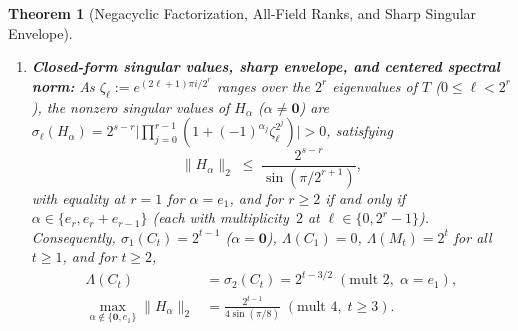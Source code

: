 \documentclass[11pt,reqno]{amsart}
\newtheorem{theorem}{Theorem}[section]
\theoremstyle{definition}
\theoremstyle{remark}
\newcommand{\zero}{\mathbf{0}}
\numberwithin{equation}{section}
\begin{document}
\begin{theorem}[Negacyclic Factorization, All-Field Ranks, and Sharp Singular Envelope]
\begin{enumerate}[leftmargin=2em,label=\textup{(\alph*)}]
    \item \textbf{Closed-form singular values, sharp envelope, and centered spectral norm:} As $\zeta_\ell := e^{(2\ell + 1)\pi i / 2^r}$ ranges over the $2^r$ eigenvalues of $T$ ($0 \le \ell < 2^r$), the nonzero singular values of $H_\alpha$ ($\alpha \neq \zero$) are $\sigma_\ell(H_\alpha) = 2^{s-r}\bigl|\prod_{j=0}^{r-1}(1 + (-1)^{\alpha_j}\zeta_\ell^{2^j})\bigr| > 0$, satisfying
    \begin{equation}
      \label{eq:spectral-env}
      \|H_\alpha\|_2 \;\le\; \frac{2^{s-r}}{\sin(\pi / 2^{r+1})},
    \end{equation}
    with equality at $r = 1$ for $\alpha = e_1$, and for $r \ge 2$ \emph{if and only if} $\alpha \in \{e_r, e_r + e_{r-1}\}$ (each with multiplicity~$2$ at $\ell \in \{0, 2^r - 1\}$). Consequently, $\sigma_1(C_t) = 2^{t-1}$ ($\alpha = \zero$), $\Lambda(C_1) = 0$, $\Lambda(M_t) = 2^t$ for all $t \ge 1$, and for $t \ge 2$,
    \begin{equation}
      \label{eq:second-sv}
      \begin{aligned}
        \Lambda(C_t) &= \sigma_2(C_t) = 2^{t - 3/2}\;(\text{mult } 2,\; \alpha = e_1), \\
        \max_{\alpha \notin \{\zero, e_1\}} \|H_\alpha\|_2 &= \frac{2^{t-1}}{4\sin(\pi / 8)}\;(\text{mult } 4,\; t \ge 3).
      \end{aligned}
    \end{equation}
  \end{enumerate}
\end{theorem}
\end{document}
